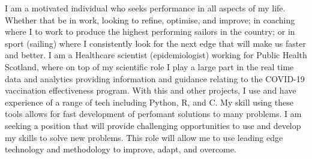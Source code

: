 \newline
\newline
\begin{cvparagraph}
I am a motivated individual who seeks performance in all aspects of my life. Whether that be in work, looking to refine, optimise, and improve; in coaching where I to work to produce the highest performing sailors in the country; or in sport (sailing) where I consistently look for the next edge that will make us faster and better.\newline
I am a Healthcare scientist (epidemiologist) working for Public Health Scotland, where on top of my scientific role I play a large part in the real time data and analytics providing information and guidance relating to the COVID-19 vaccination effectiveness program.\newline
With this and other projects, I use and have experience of a range of tech including Python, R, and C. My skill using these tools allows for fast development of perfomant solutions to many problems.\newline
I am seeking a position that will provide challenging opportunities to use and develop my skills to solve new problems. This role will allow me to use leading edge technology and methodology to improve, adapt, and overcome. 
\end{cvparagraph}
